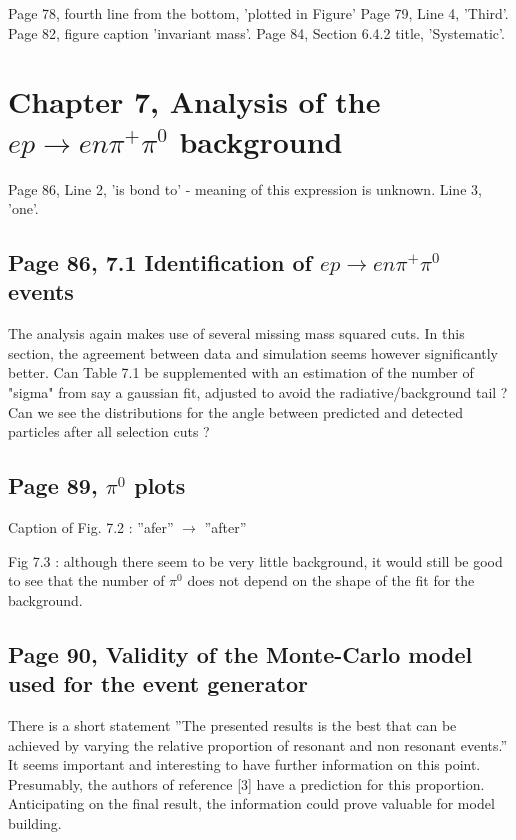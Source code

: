 \documentclass[11pt]{paper}
\begin{document}
Page 78, fourth line from the bottom, 'plotted in Figure'
Page 79, Line 4, 'Third'.
Page 82, figure caption 'invariant mass'.
Page 84, Section 6.4.2 title, 'Systematic'.

\section*{Chapter 7, Analysis of the $ep\rightarrow en\pi^+\pi^0$ background}

Page 86, Line 2, 'is bond to' - meaning of this expression is unknown. Line 3, 'one'.

\subsection*{Page 86, 7.1 Identification of $ep\rightarrow en\pi^+\pi^0$ events}

The analysis again makes use of several missing mass squared cuts.
In this section, the agreement between data and simulation seems however significantly better.
Can Table 7.1 be supplemented with an estimation of the number of "sigma" from say a gaussian fit, adjusted to avoid the radiative/background tail ?
Can we see the distributions for the angle between predicted and detected particles after all selection cuts ?

\subsection*{Page 89, $\pi^0$ plots}

Caption of Fig. 7.2 : ''afer'' $\rightarrow$ ''after''

Fig 7.3 : although there seem to be very little background, it would still be good to see that the number of $\pi^0$ does not depend on the shape of the fit for the background.

\subsection*{Page 90, Validity of the Monte-Carlo model used for the event generator}

There is a short statement ''The presented results is the best that can be achieved by varying the relative proportion of resonant and non resonant events.''
It seems important and interesting to have further information on this point.
Presumably, the authors of reference [3] have a prediction for this proportion.
Anticipating on the final result, the information could prove valuable for model building.
\end{document}
